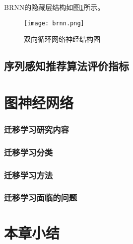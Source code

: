 BRNN的隐藏层结构如图\ref{fig:brnn}所示。
\begin{figure}[htb]
  \centering
  \texttt{[image: brnn.png]}\\
  \caption{双向循环网络神经结构图}
  \label{fig:brnn}
\end{figure}



\subsection{序列感知推荐算法评价指标}



\section{图神经网络}

\subsubsection{迁移学习研究内容}


\subsubsection{迁移学习分类}

\subsubsection{迁移学习方法}

\subsubsection{迁移学习面临的问题}

\section{本章小结}

